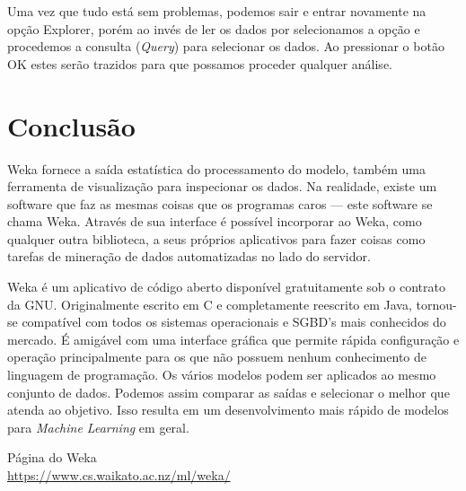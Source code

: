 \documentclass[a4paper,11pt]{article}
\begin{document}
Uma vez que tudo está sem problemas, podemos sair e entrar novamente na opção Explorer, porém ao invés de ler os dados por  selecionamos a opção  e procedemos a consulta (\textit{Query}) para selecionar os dados. Ao pressionar o botão OK estes serão trazidos para que possamos proceder qualquer análise.
	
\section{Conclusão}
Weka fornece a saída estatística do processamento do modelo, também uma ferramenta de visualização para inspecionar os dados. Na realidade, existe um software que faz as mesmas coisas que os programas caros — este software se chama Weka. Através de sua interface é possível incorporar ao Weka, como qualquer outra biblioteca, a seus próprios aplicativos para fazer coisas como tarefas de mineração de dados automatizadas no lado do servidor.

Weka é um aplicativo de código aberto disponível gratuitamente sob o contrato da GNU. Originalmente escrito em C e completamente reescrito em Java, tornou-se compatível com todos os sistemas operacionais e SGBD's mais conhecidos do mercado. É amigável com uma interface gráfica que permite rápida configuração e operação principalmente para os que não possuem nenhum conhecimento de linguagem de programação. Os vários modelos podem ser aplicados ao mesmo conjunto de dados. Podemos assim comparar as saídas e selecionar o melhor que atenda ao objetivo. Isso resulta em um desenvolvimento mais rápido de modelos para \textit{Machine Learning} em geral.



\begin{thebibliography}{4}
	Página do Weka \\
	\url{https://www.cs.waikato.ac.nz/ml/weka/}
	
	
\end{thebibliography}
\end{document}
